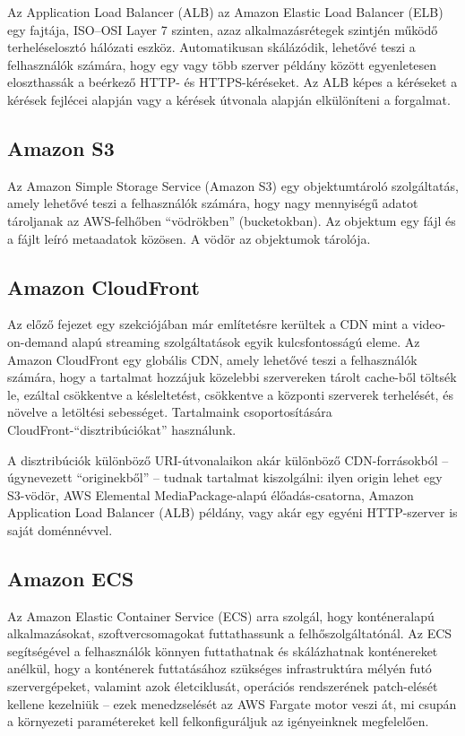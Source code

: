 Az Application Load Balancer (ALB) az Amazon Elastic Load Balancer (ELB) egy fajtája, ISO--OSI Layer 7 szinten, azaz alkalmazásrétegek szintjén működő terheléselosztó hálózati eszköz. Automatikusan skálázódik, lehetővé teszi a felhasználók számára, hogy egy vagy több szerver példány között egyenletesen eloszthassák a beérkező HTTP- és HTTPS-kéréseket. Az ALB képes a kéréseket a kérések fejlécei alapján vagy a kérések útvonala alapján elkülöníteni a forgalmat.

\subsection{Amazon S3}

Az Amazon Simple Storage Service (Amazon S3) egy objektumtároló szolgáltatás, amely lehetővé teszi a felhasználók számára, hogy nagy mennyiségű adatot tároljanak az AWS-felhőben ``vödrökben'' (bucketokban). Az objektum egy fájl és a fájlt leíró metaadatok közösen. A vödör az objektumok tárolója.

\subsection{Amazon CloudFront}

Az előző fejezet egy szekciójában már említetésre kerültek a CDN mint a video-on-demand alapú streaming szolgáltatások egyik kulcsfontosságú eleme. Az Amazon CloudFront egy globális CDN, amely lehetővé teszi a felhasználók számára, hogy a tartalmat hozzájuk közelebbi szervereken tárolt cache-ből töltsék le, ezáltal csökkentve a késleltetést, csökkentve a központi szerverek terhelését, és növelve a letöltési sebességet. Tartalmaink csoportosítására CloudFront-``disztribúciókat'' használunk.

A disztribúciók különböző URI-útvonalaikon akár különböző CDN-forrásokból -- úgynevezett ``originekből'' -- tudnak tartalmat kiszolgálni: ilyen origin lehet egy S3-vödör, AWS Elemental MediaPackage-alapú élőadás-csatorna, Amazon Application Load Balancer (ALB) példány, vagy akár egy egyéni HTTP-szerver is saját doménnévvel.

\subsection{Amazon ECS}

Az Amazon Elastic Container Service (ECS) arra szolgál, hogy konténeralapú alkalmazásokat, szoftvercsomagokat futtathassunk a felhőszolgáltatónál. Az ECS segítségével a felhasználók könnyen futtathatnak és skálázhatnak konténereket anélkül, hogy a konténerek futtatásához szükséges infrastruktúra mélyén futó szervergépeket, valamint azok életciklusát, operációs rendszerének patch-elését kellene kezelniük -- ezek menedzselését az AWS Fargate motor veszi át, mi csupán a környezeti paramétereket kell felkonfiguráljuk az igényeinknek megfelelően.

